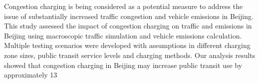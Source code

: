Congestion charging is being considered as a potential measure to address the issue of substantially increased traffic congestion and vehicle emissions in Beijing. This study assessed the impact of congestion charging on traffic and emissions in Beijing using macroscopic traffic simulation and vehicle emissions calculation. Multiple testing scenarios were developed with assumptions in different charging zone sizes, public transit service levels and charging methods. Our analysis results showed that congestion charging in Beijing may increase public transit use by approximately 13%